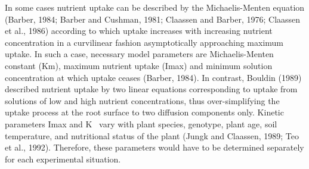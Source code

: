 In some cases nutrient uptake can be described by the Michaelis-Menten equation (Barber, 1984; Barber and Cushman, 1981; Claassen and Barber, 1976; Claassen et al., 1986) according to which uptake increases with increasing nutrient concentration in a curvilinear fashion asymptotically approaching maximum uptake. 
In such a case, necessary model parameters are Michaelis-Menten constant (Km), maximum nutrient uptake (Imax) and minimum solution concentration at which uptake ceases (Barber, 1984). 
In contrast, Bouldin (1989) described nutrient uptake by two linear equations corresponding to uptake from solutions of low and high nutrient concentrations, thus over-simplifying the uptake process at the root surface to two diffusion components only.
Kinetic parameters Imax and K~ vary with plant species, genotype, plant age, soil temperature, and nutritional status of the plant (Jungk and Claassen, 1989; Teo et al., 1992). 
Therefore, these parameters would have to be determined separately for each experimental situation. 

